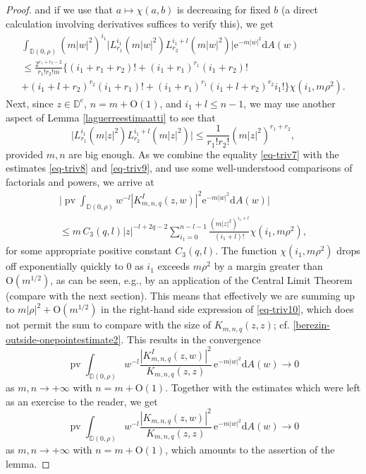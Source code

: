 \documentclass{birkart}
\theoremstyle{definition}
\theoremstyle{remark}
\numberwithin{equation}{section}
\numberwithin{figure}{section}
\newcommand{\e}{\mathrm e}
\newcommand{\1}{{\mathbf 1}}
\newcommand{\D}{{\mathbb D}}
\newcommand{\Ordo}{\mathrm{O}}
\newcommand{\diff}{{\mathrm d}}
\newcommand{\pv}{\operatorname{\mathrm{pv}}}
\begin{document}
\begin{proof}
and if we use that $a\mapsto\chi(a,b)$ is decreasing for fixed $b$
(a direct calculation involving derivatives suffices to verify this),
we get
\begin{multline}
\label{eq-triv8}
\int_{\D(0,\rho)} (m|w|^2)^{i_1}\big|L^{i_1}_{r_1}(m|w|^2)
L^{i_1+l}_{r_2}(m|w|^2)\big|\e^{-m|w|^2} \diff A(w)
\\
\le\frac{2^{r_1+r_2-2}}{r_1!r_2!m}\Bigg\{
(i_1+r_1+r_2)!+
(i_1+r_1)^{r_1}(i_1+r_2)!
\\
+(i_1+l+r_2)^{r_2}(i_1+r_1)!
+(i_1+r_1)^{r_1}(i_1+l+r_2)^{r_2}i_1!\Bigg\}\chi(i_1,m\rho^2).
\end{multline}
Next, since $z\in\D^e$, $n=m+\Ordo(1)$, and $i_1+l\le n-1$, we may use 
another aspect of Lemma \ref{laguerreestimaatti} to see that
\begin{equation}
\label{eq-triv9}
\big|L^{i_1}_{r_1}(m|z|^2)L^{i_1+l}_{r_2}(m|z|^2)\big|\le\frac{1}{r_1!r_2!}
(m|z|^2)^{r_1+r_2},
\end{equation}
provided $m,n$ are big enough. As we combine the equality \eqref{eq-triv7} 
with the estimates \eqref{eq-triv8} and \eqref{eq-triv9}, and use
some well-understood comparisons of factorials and powers, we arrive at
\begin{multline}
\label{eq-triv10}
\bigg|\pv \int_{\D(0,\rho)} w^{-l} 
|K^I_{m,n,q}(z,w)|^2\e^{-m|w|^2} \diff A(w)\bigg|
\\
\le m\,C_3(q,l)|z|^{-l+2q-2}\sum_{i_1=0}^{n-l-1}
\frac{(m|z|^2)^{i_1+l}}{(i_1+l)!}\chi(i_1,m\rho^2),
\end{multline}
for some appropriate positive constant $C_3(q,l)$. The function 
$\chi(i_1,m\rho^2)$ drops off exponentially quickly to $0$ as $i_1$ 
exceeds $m\rho^2$ by a margin greater than $\Ordo(m^{1/2})$, as can be seen, 
e.g., by an application of the Central Limit Theorem (compare with the
next section). This means that 
effectively we are summing up to $m|\rho|^2+\Ordo(m^{1/2})$ in the right-hand 
side expression of \eqref{eq-triv10}, which does not permit the sum to compare 
with the size of $K_{m,n,q}(z,z)$; cf. 
\eqref{berezin-outside-onepointestimate2}.
This results in the convergence
\begin{equation*}
\pv \int_{\D(0,\rho)} w^{-l} 
\frac{|K^I_{m,n,q}(z,w)|^2}{K_{m,n,q}(z,z)}\,\e^{-m|w|^2} \diff A(w)
\longrightarrow0
\end{equation*}
as $m,n\to+\infty$ with $n=m+\Ordo(1)$. Together with the estimates which were
left as an exercise to the reader, we get
\begin{equation*}
\pv \int_{\D(0,\rho)} w^{-l} 
\frac{|K_{m,n,q}(z,w)|^2}{K_{m,n,q}(z,z)}\,\e^{-m|w|^2} \diff A(w)
\longrightarrow0
\end{equation*} 
as $m,n\to+\infty$ with $n=m+\Ordo(1)$, which amounts to the assertion of the
lemma.
\end{proof}
\end{document}
